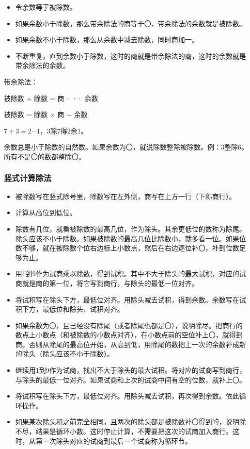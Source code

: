 \documentclass[12pt,UTF8]{ctexbook}
\begin{document}
\begin{itemize}
\item 令余数等于被除数。
\item 如果余数小于除数，那么带余除法的商等于〇，带余除法的余数就是被除数。
\item 如果余数不小于除数，那么从余数中减去除数，同时商加一。
\item 不断重复，直到余数小于除数，这时的商就是带余除法的商，这时的余数就是带余除法的余数。
\end{itemize}

带余除法：

被除数 ÷ 除数 = 商 ··· 余数

被除数 = 除数 × 商 + 余数

\( 7 \div 3 = 2 \cdots 1 \)，\( 3 \)除\( 7 \)得\( 2 \)余\( 1 \)。

余数总是小于除数的自然数。如果余数为〇，就说除数整除被除数。例：\( 3 \)整除\( 6 \)。所有不是〇的数都整除〇。

\subsubsection{竖式计算除法}

\begin{itemize}
\item 被除数写在竖式除号里，除数写在左外侧，商写在上方一行（下称商行）。
\item 计算从高位到低位。
\item 除数有几位，就看被除数的最高几位，作为除头。其余更低位的数称为除尾。除头应该不小于除数。如果被除数的最高几位比除数小，就多看一位。如果位数不够，就在被除数个位右边标上小数点，然后在右边逐位补〇，补到位数足够为止。
\item 用1到9作为试商乘以除数，得到试积。其中不大于除头的最大试积，对应的试商就是商的第一位，将它写到商行，与除头的最低一位对齐。
\item 将试积写在除头下方，最低位对齐。用除头减去试积，得到余数。余数写在试积下方，最低位和除头、试积对齐。
\item 如果余数为〇，且已经没有除尾（或者除尾也都是〇），说明除尽。把商行的数点上小数点（和被除数的小数点对齐），在小数点前的空位补上〇，就得到商。否则从除尾的最高位开始，从高到低，用除尾的数把上一次的余数补成新的除头（除头应该不小于除数）。
\item 继续用1到9作为试商，找出不大于除头的最大试积。将对应的试商写到商行，与除头的最低一位对齐。如果试商和上次的试商中间有空的位数，就补上〇。
\item 将试积写在除头下方，最低位对齐。用除头减去试积，再次得到余数。依此循环操作。
\item 如果某次除头和之前完全相同，且两次的除头都是被除数补〇得到的，说明除不尽，结果是循环小数。这时停止计算，不需要把这次的试商加入商行。这时，从第一次除头对应的试商到最后一个试商称为循环节。
\end{itemize}
\end{document}
